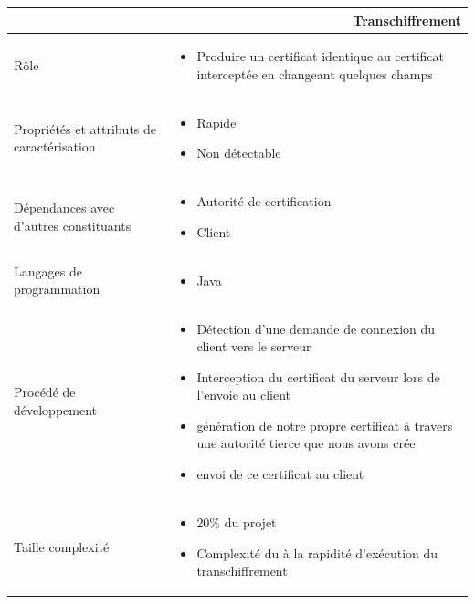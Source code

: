 \documentclass[a4paper,11pt,french]{article}
\begin{document}
\begin{center}
        \vspace*{0.7cm}
        \begin{tabularx}{16cm}{|l|X|}
        \hline
        \multicolumn{2}{|r|}{\textbf{Transchiffrement}}\\
        \hline
        R\^ole &  \begin{itemize}\item Produire un certificat identique au certificat interceptée en changeant quelques champs \end{itemize}\\
        \hline
        Propriétés et attributs de caractérisation & \begin{itemize} \item Rapide \item Non détectable\end{itemize}\\
        \hline
        Dépendances avec d'autres constituants & \begin{itemize}\item Autorité de certification \item Client\end{itemize}\\
        \hline
        Langages de programmation & \begin{itemize} \item Java \end{itemize}\\
        \hline
        Procédé de développement & \begin{itemize}\item Détection d'une demande de connexion du client vers le serveur \item Interception du certificat du serveur lors de l'envoie au client \item génération de notre propre certificat à travers une autorité tierce que nous avons crée \item envoi de ce certificat au client 
        \end{itemize}\\
        \hline
        Taille complexité & \begin{itemize}\item 20\% du projet \item Complexité du à la rapidité d'exécution du transchiffrement \end{itemize}\\
        \hline
        \end{tabularx}
\end{center}
\end{document}
